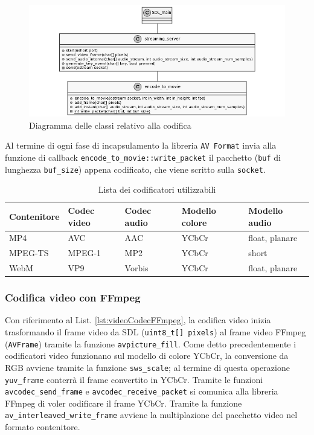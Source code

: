 \begin{figure}[H]
	\includegraphics[width=\linewidth]{immagini/class_server_and_encoding}
	\caption{Diagramma delle classi relativo alla codifica}
	\label{fig:class_server_and_encoding}
\end{figure}

Al termine di ogni fase di incapsulamento la libreria \verb|AV Format| invia alla funzione di callback \verb|encode_to_movie::write_packet| il pacchetto (\verb|buf| di lunghezza \verb|buf_size|) appena codificato, che viene scritto sulla \verb|socket|. 

\begin{table}[H]
	\centering
	\begin{tabular}{||l l l l l||} 
		\hline
		Contenitore & Codec video & Codec audio & Modello colore & Modello audio \\
		\hline\hline
		MP4 & AVC & AAC & YCbCr & float, planare \\
		\hline
		MPEG-TS & MPEG-1 & MP2 & YCbCr & short \\
		\hline
		WebM & VP9 & Vorbis & YCbCr & float, planare \\
		\hline
	\end{tabular}

	\caption{Lista dei codificatori utilizzabili}
	\label{table:PossibiliCodifiche}
\end{table}



\subsubsection{Codifica video con FFmpeg}
Con riferimento al List. \ref{lst:videoCodecFFmpeg}, la codifica video inizia trasformando il frame video da SDL (\verb|uint8_t[] pixels|) al frame video FFmpeg (\verb|AVFrame|) tramite la funzione \verb|avpicture_fill|. Come detto precedentemente i codificatori video funzionano sul modello di colore YCbCr, la conversione da RGB avviene tramite la funzione \verb|sws_scale|; al termine di questa operazione \verb|yuv_frame| conterrà il frame convertito in YCbCr. Tramite le funzioni \verb|avcodec_send_frame| e \verb|avcodec_receive_packet| si comunica alla libreria FFmpeg di voler codificare il frame YCbCr. Tramite la funzione \verb|av_interleaved_write_frame| avviene la multiplazione del pacchetto video nel formato contenitore.

